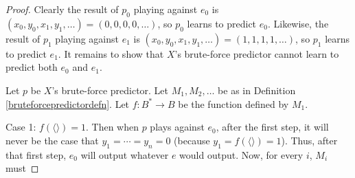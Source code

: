 \documentclass{article}
\begin{document}
\begin{proof}
    Clearly the result of $p_0$ playing against $e_0$ is
    $(x_0,y_0,x_1,y_1,\ldots)=(0,0,0,0,\ldots)$, so $p_0$ learns to predict $e_0$.
    Likewise, the result of $p_1$ playing against $e_1$ is
    $(x_0,y_0,x_1,y_1,\ldots)=(1,1,1,1,\ldots)$, so $p_1$ learns to predict $e_1$.
    It remains to show that $X$'s brute-force predictor cannot learn to predict
    both $e_0$ and $e_1$.

    Let $p$ be $X$'s brute-force predictor.
    Let $M_1,M_2,\ldots$ be as in Definition \ref{bruteforcepredictordefn}.
    Let $f:B^*\to B$ be the function defined by $M_1$.

    Case 1: $f(\langle\rangle)=1$. Then when $p$ plays against $e_0$,
    after the first step, it will never be the case that
    $y_1=\cdots=y_n=0$ (because $y_1=f(\langle\rangle)=1$).
    Thus, after that first step, $e_0$ will output whatever $e$ would output.
    Now, for every $i$, $M_i$ must 
\end{proof}

%




\end{document}
